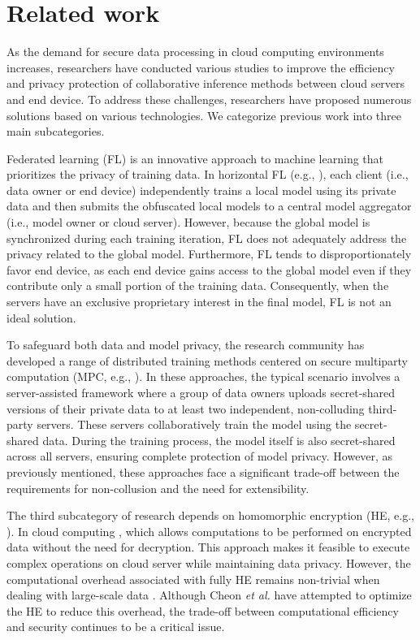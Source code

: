 \documentclass[conference]{IEEEtran}
\begin{document}
\section{Related work}
As the demand for secure data processing in cloud computing environments increases, researchers have conducted various studies to improve the efficiency and privacy protection of collaborative inference methods between cloud servers and end device. To address these challenges, researchers have proposed numerous solutions based on various technologies. We categorize previous work into three main subcategories.

Federated learning (FL) is an innovative approach to machine learning that prioritizes the privacy of training data. In horizontal FL (e.g., \cite{pmlr-v54-mcmahan17a,Gupta2018DistributedLO,9252066}), each client (i.e., data owner or end device) independently trains a local model using its private data and then submits the obfuscated local models to a central model aggregator (i.e., model owner or cloud server). However, because the global model is synchronized during each training iteration, FL does not adequately address the privacy related to the global model. Furthermore, FL tends to disproportionately favor end device, as each end device gains access to the global model even if they contribute only a small portion of the training data. Consequently, when the servers have an exclusive proprietary interest in the final model, FL is not an ideal solution.

To safeguard both data and model privacy, the research community has developed a range of distributed training methods centered on secure multiparty computation (MPC, e.g., \cite{7958569,Escudero2020ImprovedPF,Dalskov2020FantasticFH}). In these approaches, the typical scenario involves a server-assisted framework where a group of data owners uploads secret-shared versions of their private data to at least two independent, non-colluding third-party servers. These servers collaboratively train the model using the secret-shared data. During the training process, the model itself is also secret-shared across all servers, ensuring complete protection of model privacy. However, as previously mentioned, these approaches face a significant trade-off between the requirements for non-collusion and the need for extensibility.

The third subcategory of research depends on homomorphic encryption (HE, e.g., \cite{Nandakumar2019TowardsDN, CiC-1-2-22,9888863, zhao2023identifiable}). In cloud computing \cite{gentry2009fully}, which allows computations to be performed on encrypted data without the need for decryption. This approach makes it feasible to execute complex operations on cloud server while maintaining data privacy. However, the computational overhead associated with fully HE remains non-trivial when dealing with large-scale data \cite{xu2019cryptonn}. Although Cheon \textit{et al.} \cite{cheon2017homomorphic} have attempted to optimize the HE to reduce this overhead, the trade-off between computational efficiency and security continues to be a critical issue.
\end{document}
